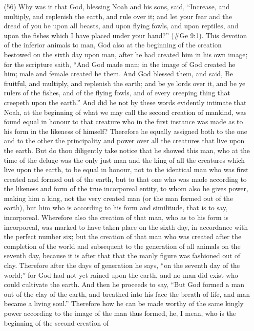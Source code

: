 (56) Why was it that God, blessing Noah and his sons, said, ``Increase, and multiply, and replenish
the earth, and rule over it; and let your fear and the dread of you be upon all beasts, and upon flying
fowls, and upon reptiles, and upon the fishes which I have placed under your hand?'' (\#Ge 9:1).
This devotion of the inferior animals to man, God also at the beginning of the creation bestowed on
the sixth day upon man, after he had created him in his own image; for the scripture saith, ``And
God made man; in the image of God created he him; male and female created he them. And God
blessed them, and said, Be fruitful, and multiply, and replenish the earth; and be ye lords over it,
and be ye rulers of the fishes, and of the flying fowls, and of every creeping thing that creepeth
upon the earth.'' And did he not by these words evidently intimate that Noah, at the beginning of
what we may call the second creation of mankind, was found equal in honour to that creature who
in the first instance was made as to his form in the likeness of himself? Therefore he equally
assigned both to the one and to the other the principality and power over all the creatures that live
upon the earth. But do thou diligently take notice that he showed this man, who at the time of the
deluge was the only just man and the king of all the creatures which live upon the earth, to be equal
in honour, not to the identical man who was first created and formed out of the earth, but to that
one who was made according to the likeness and form of the true incorporeal entity, to whom also
he gives power, making him a king, not the very created man (or the man formed out of the earth),
but him who is according to his form and similitude, that is to say, incorporeal. Wherefore also the
creation of that man, who as to his form is incorporeal, was marked to have taken place on the
sixth day, in accordance with the perfect number six; but the creation of that man who was created
after the completion of the world and subsequent to the generation of all animals on the seventh
day, because it is after that that the manly figure was fashioned out of clay. Therefore after the
days of generation he says, ``on the seventh day of the world;'' for God had not yet rained upon the
earth, and no man did exist who could cultivate the earth. And then he proceeds to say, ``But God
formed a man out of the clay of the earth, and breathed into his face the breath of life, and man
became a living soul.'' Therefore how he can be made worthy of the same kingly power according
to the image of the man thus formed, he, I mean, who is the beginning of the second creation of
